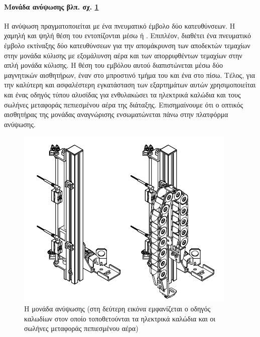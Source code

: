 \documentclass[a4paper,12pt,twoside]{report}
\begin{document}
{				\paragraph{Μονάδα ανύψωσης {\footnotesize βλπ. σχ. \ref{φωτ:Η μονάδα ανύψωσης από Festo}}} {Η ανύψωση πραγματοποιείται με ένα \gls{πνευματικό έμβολο} δύο κατευθύνσεων. Η χαμηλή και ψηλή θέση του εντοπίζονται μέσω  ή . Επιπλέον, διαθέτει ένα πνευματικό \gls{έμβολο εκτίναξης} δύο κατευθύνσεων για την απομάκρυνση των αποδεκτών τεμαχίων στην μονάδα κύλισης με εξομάλυνση αέρα και των απορριφθέντων τεμαχίων στην απλή μονάδα κύλισης. Η θέση του εμβόλου αυτού διαπιστώνεται μέσω δύο μαγνητικών αισθητήρων, έναν στο μπροστινό τμήμα του και ένα στο πίσω. Τέλος, για την καλύτερη και ασφαλέστερη εγκατάσταση των εξαρτημάτων αυτών χρησιμοποιείται και ένας οδηγός τύπου αλυσίδας για ενθυλακώσει τα ηλεκτρικά καλώδια και τους σωλήνες μεταφοράς πεπιεσμένου αέρα της διάταξης. Επισημαίνουμε ότι ο οπτικός αισθητήρας της μονάδας αναγνώρισης ενσωματώνεται πάνω στην πλατφόρμα ανύψωσης.
				}
				\begin{figure}[hp]
					\centering
					\includegraphics[scale=0.5]{TestingStationLiftingModule.png}
					\caption{Η μονάδα ανύψωσης \cite{FestoMPSTestingStationManual} (στη δεύτερη εικόνα εμφανίζεται ο οδηγός καλωδίων στον οποίο τοποθετούνται τα ηλεκτρικά καλώδια και οι σωλήνες μεταφοράς πεπιεσμένου αέρα)}
					\label{φωτ:Η μονάδα ανύψωσης από Festo}
				\end{figure}
				
}
\end{document}
